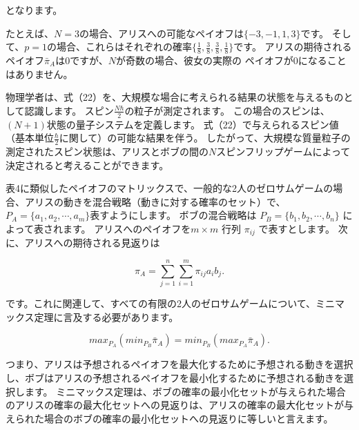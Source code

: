 となります。

たとえば、$N = 3$の場合、アリスへの可能なペイオフは$\{-3,-1,1,3 \}$です。
そして、$p = 1$の場合、これらはそれぞれの確率$ \{ \frac{1}{8},\frac{3}{8},\frac{3}{8},\frac{1}{8} \} $です。
アリスの期待されるペイオフ$\bar{\pi}_A$は$0$ですが、$N$が奇数の場合、彼女の実際の
ペイオフが$0$になることはありません。

物理学者は、式（22）を、大規模な場合に考えられる結果の状態を与えるものとして認識します。
スピン$\frac{N \hbar}{2}$の粒子が測定されます。
この場合のスピンは、$(N+1)$状態の量子システムを定義します。
式（22）で与えられるスピン値（基本単位$\frac{\hbar}{2} $に関して）の可能な結果を伴う。 したがって、大規模な質量粒子の測定されたスピン状態は、アリスとボブの間の$N$スピンフリップゲームによって決定されると考えることができます。

表4に類似したペイオフのマトリックスで、一般的な2人のゼロサムゲームの場合、アリスの動きを混合戦略（動きに対する確率のセット）で、$P_ A = \{ a_1, a_2, \cdots , a_m \} $表すようにします。 ボブの混合戦略は $ P_B = \{ b_1, b_2, \cdots, b_n \} $ によって表されます。
アリスへのペイオフを$m \times m $ 行列 $ \pi_{ij} $ で表すとします。 次に、アリスへの期待される見返りは

\begin{equation}
\label{24}
\pi_A = \sum_{j=1}^{n} \sum_{i=1}^{m} \pi_{ij} a_i b_j.
\end{equation}

です。これに関連して、すべての有限の2人のゼロサムゲームについて、ミニマックス定理に言及する必要があります。

\begin{equation}
\label{25}
max_{P_A} ( min_{P_B} \bar{\pi}_A ) = min_{P_B} ( max_{P_A} \bar{\pi}_A ).
\end{equation}

つまり、アリスは予想されるペイオフを最大化するために予想される動きを選択し、ボブはアリスの予想されるペイオフを最小化するために予想される動きを選択します。 ミニマックス定理は、ボブの確率の最小化セットが与えられた場合のアリスの確率の最大化セットへの見返りは、アリスの確率の最大化セットが与えられた場合のボブの確率の最小化セットへの見返りに等しいと言えます。






